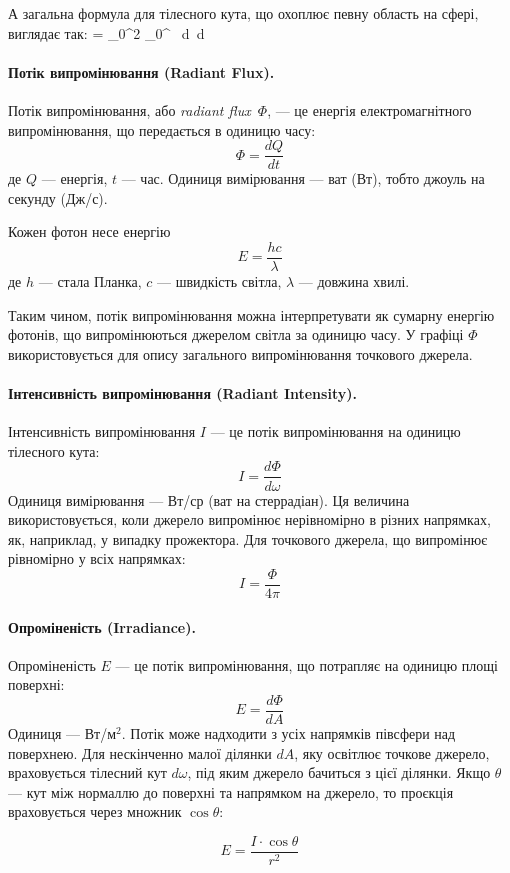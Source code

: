 А загальна формула для тілесного кута, що охоплює певну область на сфері, виглядає так:
\omega = \int_0^{2\pi} \int_0^{\pi} \sin{\theta} \, d\theta \, d\phi
\eq

\paragraph{Потік випромінювання (Radiant Flux).}
Потік випромінювання, або \textit{radiant flux}~$\Phi$, — це енергія електромагнітного випромінювання, що передається в одиницю часу:
\[
\Phi = \frac{dQ}{dt}
\]
де $Q$ — енергія, $t$ — час. Одиниця вимірювання — ват (Вт), тобто джоуль на секунду (Дж/с).

Кожен фотон несе енергію
\[
E = \frac{hc}{\lambda}
\]
де $h$ — стала Планка, $c$ — швидкість світла, $\lambda$ — довжина хвилі.

Таким чином, потік випромінювання можна інтерпретувати як сумарну енергію фотонів, що випромінюються джерелом світла за одиницю часу. У графіці $\Phi$ 
використовується для опису загального випромінювання точкового джерела.

\paragraph{Інтенсивність випромінювання (Radiant Intensity).}
Інтенсивність випромінювання $I$ — це потік випромінювання на одиницю тілесного кута:
\[
I = \frac{d\Phi}{d\omega}
\]
Одиниця вимірювання — Вт/ср (ват на стеррадіан). Ця величина використовується, коли джерело випромінює нерівномірно в різних напрямках, як, наприклад, 
у випадку прожектора. Для точкового джерела, що випромінює рівномірно у всіх напрямках:
\[
I = \frac{\Phi}{4\pi}
\]

\paragraph{Опроміненість (Irradiance).}
Опроміненість $E$ — це потік випромінювання, що потрапляє на одиницю площі поверхні:
\[
E = \frac{d\Phi}{dA}
\]
Одиниця — Вт/м$^2$. Потік може надходити з усіх напрямків півсфери над поверхнею. Для нескінченно малої ділянки $dA$, яку 
освітлює точкове джерело, враховується тілесний кут $d\omega$, під яким джерело бачиться з цієї ділянки. Якщо $\theta$ — кут між нормаллю до 
поверхні та напрямком на джерело, то проєкція враховується через множник $\cos{\theta}$:

\[
E = \frac{I \cdot \cos{\theta}}{r^2}
\]

